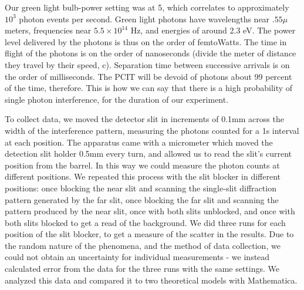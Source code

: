 \documentclass[prb,preprint]{revtex4-1}
\begin{document}
Our green light bulb-power setting was at 5, which correlates to approximately $10^{3}$ photon events per second.  Green light photons have wavelengths near $.55 \mu $ meters, frequencies near $5.5 \times 10^{14} $ Hz, and energies of around 2.3 eV.  The power level delivered by the photons is thus on the order of femtoWatts.  The time in flight of the photons is on the order of nanoseconds (divide the meter of distance they travel by their speed, c).  Separation time between successive arrivals is on the order of milliseconds.  The PCIT will be devoid of photons about 99 percent of the time, therefore.  This is how we can say that there is a high probability of single photon interference, for the duration of our experiment.

To collect data, we moved the detector slit in increments of 0.1mm across the width of the interference pattern, measuring the photons counted for a 1s interval at each position.  The apparatus came with a micrometer which moved the detection slit holder 0.5mm every turn, and allowed us to read the slit's current position from the barrel.  In this way we could measure the photon counts at different positions.  We repeated this process with the slit blocker in different positions: once blocking the near slit and scanning the single-slit diffraction pattern generated by the far slit, once blocking the far slit and scanning the pattern produced by the near slit, once with both slits unblocked, and once with both slits blocked to get a read of the background.  We did three runs for each position of the slit blocker, to get a measure of the scatter in the results.  Due to the random nature of the phenomena, and the method of data collection, we could not obtain an uncertainty for individual measurements - we instead calculated error from the data for the three runs with the same settings.  We analyzed this data and compared it to two theoretical models with Mathematica.  
\end{document}
